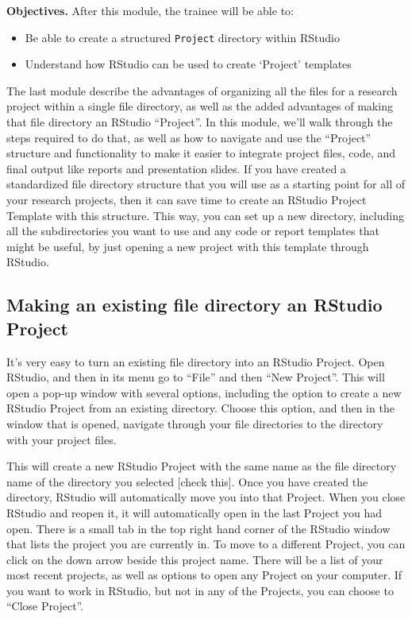 \documentclass[]{tufte-book}
\providecommand{\tightlist}{%
  \setlength{\itemsep}{0pt}\setlength{\parskip}{0pt}}
\begin{document}
\textbf{Objectives.} After this module, the trainee will be able to:

\begin{itemize}
\tightlist
\item
  Be able to create a structured \texttt{Project} directory within RStudio
\item
  Understand how RStudio can be used to create `Project' templates
\end{itemize}

The last module describe the advantages of organizing all the files for a
research project within a single file directory, as well as the added
advantages of making that file directory an RStudio ``Project''. In this
module, we'll walk through the steps required to do that, as well as
how to navigate and use the ``Project'' structure and functionality to
make it easier to integrate project files, code, and final output like
reports and presentation slides. If you have created a standardized
file directory structure that you will use as a starting point for all of
your research projects, then it can save time to create an RStudio Project
Template with this structure. This way, you can set up a new directory,
including all the subdirectories you want to use and any code or report
templates that might be useful, by just opening a new project with this
template through RStudio.

\hypertarget{making-an-existing-file-directory-an-rstudio-project}{%
\subsection{Making an existing file directory an RStudio Project}\label{making-an-existing-file-directory-an-rstudio-project}}

It's very easy to turn an existing file directory into an RStudio Project.
Open RStudio, and then in its menu go to ``File'' and then ``New Project''.
This will open a pop-up window with several options, including the option to
create a new RStudio Project from an existing directory. Choose this option,
and then in the window that is opened, navigate through your file directories
to the directory with your project files.

This will create a new RStudio Project with the same name as the file directory
name of the directory you selected {[}check this{]}. Once you have created the
directory, RStudio will automatically move you into that Project. When you
close RStudio and reopen it, it will automatically open in the last Project
you had open. There is a small tab in the top right hand corner of the RStudio
window that lists the project you are currently in. To move to a different Project,
you can click on the down arrow beside this project name. There will be a list
of your most recent projects, as well as options to open any Project on your
computer. If you want to work in RStudio, but not in any of the Projects, you can
choose to ``Close Project''.
\end{document}
